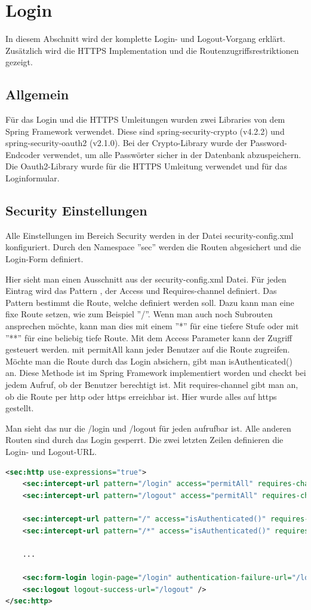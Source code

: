 \newpage

\section{Login}
In diesem Abschnitt wird der komplette Login- und Logout-Vorgang erklärt. Zusätzlich wird die HTTPS Implementation und die Routenzugriffsrestriktionen gezeigt.

\subsection{Allgemein}
Für das Login und die HTTPS Umleitungen wurden zwei Libraries von dem Spring Framework verwendet.
Diese sind spring-security-crypto (v4.2.2) und spring-security-oauth2 (v2.1.0). Bei der Crypto-Library wurde der Password-Endcoder verwendet, um alle Passwörter sicher in der Datenbank abzuspeichern. Die Oauth2-Library wurde für die HTTPS Umleitung verwendet und für das Loginformular.

\subsection{Security Einstellungen}
Alle Einstellungen im Bereich Security werden in der Datei security-config.xml konfiguriert. Durch den Namespace ''sec'' werden die Routen abgesichert und die Login-Form definiert.

Hier sieht man einen Ausschnitt aus der security-config.xml Datei. Für jeden Eintrag wird das Pattern , der Access und Requires-channel definiert. Das Pattern bestimmt die Route, welche definiert werden soll. Dazu kann man eine fixe Route setzen, wie zum Beispiel ''/''. Wenn man auch noch Subrouten ansprechen möchte, kann man dies mit einem ''*'' für eine tiefere Stufe oder mit ''**'' für eine beliebig tiefe Route. 
Mit dem Access Parameter kann der Zugriff gesteuert werden. mit permitAll kann jeder Benutzer auf die Route zugreifen. Möchte man die Route durch das Login absichern, gibt man isAuthenticated() an. Diese Methode ist im Spring Framework implementiert worden und checkt bei jedem Aufruf, ob der Benutzer berechtigt ist. Mit requires-channel gibt man an, ob die Route per http oder https erreichbar ist. Hier wurde alles auf https gestellt.

Man sieht das nur die /login und /logout für jeden aufrufbar ist. Alle anderen Routen sind durch das Login gesperrt. Die zwei letzten Zeilen definieren die Login- und Logout-URL.
\begin{lstlisting}[language=xml]
<sec:http use-expressions="true">
	<sec:intercept-url pattern="/login" access="permitAll" requires-channel="https"/>
	<sec:intercept-url pattern="/logout" access="permitAll" requires-channel="https"/>
	
	<sec:intercept-url pattern="/" access="isAuthenticated()" requires-channel="https" />
	<sec:intercept-url pattern="/*" access="isAuthenticated()" requires-channel="https" />
	
	...
		
	<sec:form-login login-page="/login" authentication-failure-url="/login?error=true" />
	<sec:logout logout-success-url="/logout" />
</sec:http>
\end{lstlisting}

